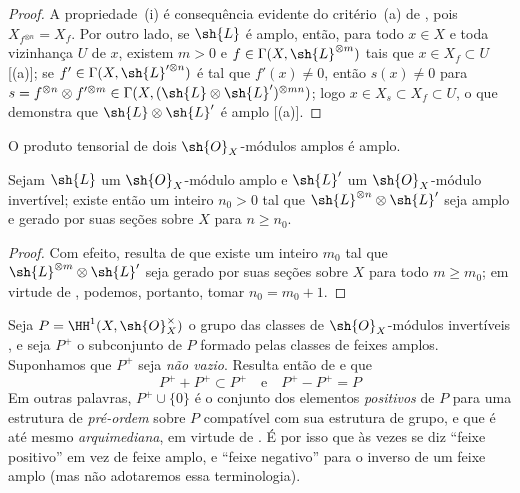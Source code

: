 \documentclass[oneside,10pt]{amsart}
\renewcommand{\geq}{\geqslant}
\let\EGAOriginalLabel\label
\renewcommand{\label}[1]{\phantomsection\EGAOriginalLabel{#1}}
\begin{document}
\begin{proof}
A propriedade~(i) é consequência evidente do critério~(a) de , pois $X_{f^{\otimes n}}=X_f$.
Por outro lado, se $\sh{L}$ é amplo, então, para todo $x\in X$ e toda vizinhança $U$ de $x$, existem $m>0$ e $f\in\Gamma(X,\sh{L}^{\otimes m})$ tais que $x\in X_f\subset U$ [(a)];
se $f'\in\Gamma(X,\sh{L}'^{\otimes n})$ é tal que $f'(x)\neq0$, então $s(x)\neq0$ para $s=f^{\otimes n}\otimes f'^{\otimes m}\in\Gamma(X,(\sh{L}\otimes\sh{L}')^{\otimes mn})$; logo $x\in X_s\subset X_f\subset U$, o que demonstra que $\sh{L}\otimes\sh{L}'$ é amplo [(a)].
\end{proof}

\begin{corollary}[4.5.7]
\label{II.4.5.7}
O produto tensorial de dois $\sh{O}_X$-módulos amplos é amplo.
\end{corollary}

\begin{corollary}[4.5.8]
\label{II.4.5.8}
Sejam $\sh{L}$ um $\sh{O}_X$-módulo amplo e $\sh{L}'$ um $\sh{O}_X$-módulo invertível;
existe então um inteiro $n_0>0$ tal que $\sh{L}^{\otimes n}\otimes\sh{L}'$ seja amplo e gerado por suas seções sobre $X$ para $n\geq n_0$.
\end{corollary}

\begin{proof}
Com efeito, resulta de  que existe um inteiro $m_0$ tal que $\sh{L}^{\otimes m}\otimes\sh{L}'$ seja gerado por suas seções sobre $X$ para todo $m\geq m_0$;
em virtude de , podemos, portanto, tomar $n_0=m_0+1$.
\end{proof}

\begin{remark}[4.5.9]
\label{II.4.5.9}
Seja $P=\HH^1(X,\sh{O}_X^\times)$ o grupo das classes de $\sh{O}_X$-módulos invertíveis , e seja $P^+$ o subconjunto de $P$ formado pelas classes de feixes amplos.
Suponhamos que $P^+$ seja \emph{não vazio}.
Resulta então de  e  que
\[
  P^+ + P^+ \subset P^+
  \quad\text{e}\quad
  P^+ - P^+ = P
\]
Em outras palavras, $P^+\cup\{0\}$ é o conjunto dos elementos \emph{positivos} de $P$ para uma estrutura de \emph{pré-ordem} sobre $P$ compatível com sua estrutura de grupo, e que é até mesmo \emph{arquimediana}, em virtude de .
É por isso que às vezes se diz ``feixe positivo'' em vez de feixe amplo, e ``feixe negativo'' para o inverso de um feixe amplo (mas não adotaremos essa terminologia).
\end{remark}
\end{document}
